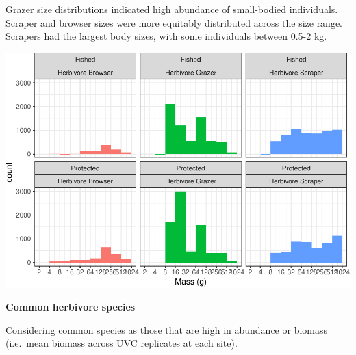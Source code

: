 \documentclass[]{article}
\begin{document}
Grazer size distributions indicated high abundance of small-bodied
individuals. Scraper and browser sizes were more equitably distributed
across the size range. Scrapers had the largest body sizes, with some
individuals between 0.5-2 kg.

\includegraphics{UVC-datasets-explore_files/figure-latex/unnamed-chunk-4-1.pdf}

\textbf{Common herbivore species}

Considering common species as those that are high in abundance or
biomass (i.e.~mean biomass across UVC replicates at each site).
\end{document}
